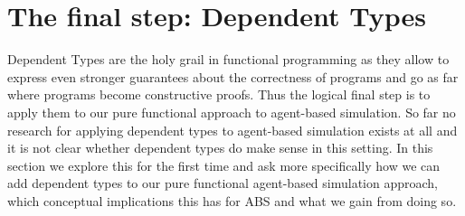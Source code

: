 \section{The final step: Dependent Types}
Dependent Types are the holy grail in functional programming as they allow to express even stronger guarantees about the correctness of programs and go as far where programs become constructive proofs. Thus the logical final step is to apply them to our pure functional approach to agent-based simulation.
So far no research for applying dependent types to agent-based simulation exists at all and it is not clear whether dependent types do make sense in this setting.
In this section we explore this for the first time and ask more specifically how we can add dependent types to our pure functional agent-based simulation approach, which conceptual implications this has for ABS and what we gain from doing so.

\cite{brady_idris_2013}
\cite{brady_type-driven_2017}
\cite{altenkirch_pi_sigma:_2010}
\cite{program_homotopy_2013}
\cite{altenkirch_why_2005}